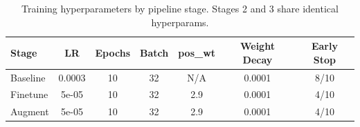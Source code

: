 \begin{table}[htbp]
\centering
\caption{Training hyperparameters by pipeline stage. Stages 2 and 3 share identical hyperparams.}
\label{tab:training_config}
\begin{tabular}{lcccccc}
\toprule
\textbf{Stage} & LR & Epochs & Batch & pos\_wt & Weight Decay & Early Stop \\
\midrule
Baseline & 0.0003 & 10 & 32 & N/A & 0.0001 & 8/10 \\
Finetune & 5e-05 & 10 & 32 & 2.9 & 0.0001 & 4/10 \\
Augment & 5e-05 & 10 & 32 & 2.9 & 0.0001 & 4/10 \\
\bottomrule
\end{tabular}
\end{table}
